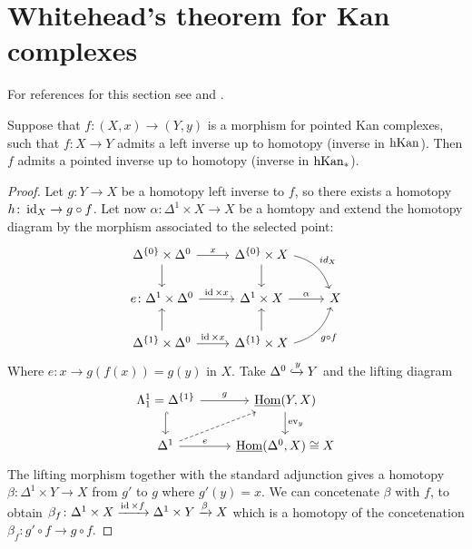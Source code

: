 \section{Whitehead's theorem for Kan complexes}

For references for this section see \cite[Section I.7]{GoerSimp1999} and \cite[Section 3.2.7]{kerodon}.

\begin{lem}
\label{homotopy inverses are pointed homotopy inverses}
    Suppose that $f\colon (X,x) \to (Y,y)$ is a morphism for pointed Kan complexes, such that $f\colon X \to Y$ admits a left inverse up to homotopy (inverse in $\operatorname{hKan}$).
    Then $f$ admits a pointed inverse up to homotopy (inverse in $\operatorname{hKan}_*$).
\end{lem}

\begin{proof}
    Let $g\colon Y \to X$ be a homotopy left inverse to $f$, so there exists a homotopy $h\colon \operatorname{id}_X \to g\circ f$.
    Let now $\alpha \colon \Delta^1 \times X \to X$ be a homtopy and extend the homotopy diagram by the morphism associated to the selected point:
    \[
    \begin{tikzcd}
        \Delta^{\{0\}} \times \Delta^0
        \ar[r, "x"]
        \ar[d]
        &
        \Delta^{\{0\}} \times X
        \ar[d]
        \ar[rd, bend left, "id_X"]
        \\
        e\colon\Delta^1 \times \Delta^0
        \ar[r, "\id \times x"]
        &
        \Delta^1 \times X
        \ar[r, "\alpha"]
        &
        X
        \\
        \Delta^{\{1\}} \times \Delta^0
        \ar[u]
        \ar[r, "\id \times x"]
        &
        \Delta^{\{1\}} \times X
        \ar[u]
        \ar[ru, bend right, "g \circ f"']
    \end{tikzcd}
    \]
    Where $e\colon x \to g(f(x))=g(y)$ in $X$.
    Take $\Delta^0 \xhookrightarrow{y} Y$ and the lifting diagram
    \[
    \begin{tikzcd}
        \Lambda^1_1= \Delta^{\{1\}}
        \ar[r, "g"]
        \ar[d, hook]
        &
        \underline{\Hom}(Y,X)
        \ar[d, "\ev_y"]
        \\
        \Delta^1
        \ar[ru, dashed]
        \ar[r, "e"]
        &
        \underline{\Hom}(\Delta^0,X) \cong X
    \end{tikzcd}
    \]
    The lifting morphism together with the standard adjunction gives a homotopy $\beta \colon \Delta^1 \times Y \to  X$ from $g'$ to $g$ where $g'(y)=x$.
    We can concetenate $\beta$ with $f$, to obtain $\beta_f \colon \Delta^1 \times X \xrightarrow{\operatorname{id} \times f} \Delta^1 \times Y \xrightarrow{ \beta}X$ which is a homotopy of the concetenation $\beta_f \colon g' \circ f \to g \circ f$.

\end{proof}

